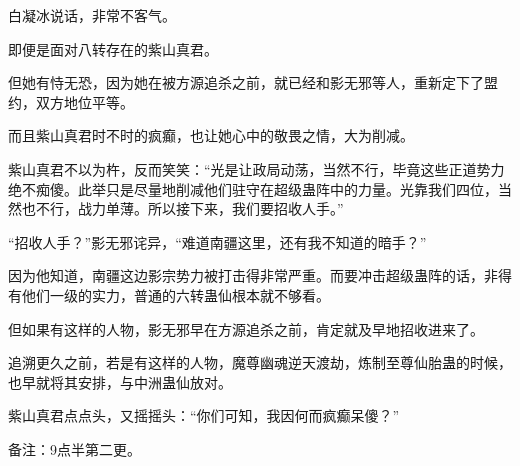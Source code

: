 \begin{this_body}
白凝冰说话，非常不客气。

即便是面对八转存在的紫山真君。

但她有恃无恐，因为她在被方源追杀之前，就已经和影无邪等人，重新定下了盟约，双方地位平等。

而且紫山真君时不时的疯癫，也让她心中的敬畏之情，大为削减。

紫山真君不以为杵，反而笑笑：“光是让政局动荡，当然不行，毕竟这些正道势力绝不痴傻。此举只是尽量地削减他们驻守在超级蛊阵中的力量。光靠我们四位，当然也不行，战力单薄。所以接下来，我们要招收人手。”

“招收人手？”影无邪诧异，“难道南疆这里，还有我不知道的暗手？”

因为他知道，南疆这边影宗势力被打击得非常严重。而要冲击超级蛊阵的话，非得有他们一级的实力，普通的六转蛊仙根本就不够看。

但如果有这样的人物，影无邪早在方源追杀之前，肯定就及早地招收进来了。

追溯更久之前，若是有这样的人物，魔尊幽魂逆天渡劫，炼制至尊仙胎蛊的时候，也早就将其安排，与中洲蛊仙放对。

紫山真君点点头，又摇摇头：“你们可知，我因何而疯癫呆傻？”

备注：9点半第二更。

\end{this_body}

